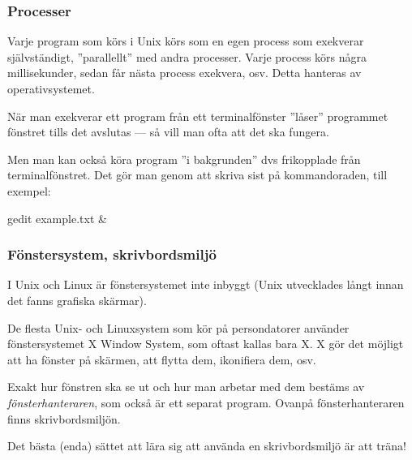 \begin{frame}[fragile=singleslide]
\frametitle{Processer}
Varje program som körs i Unix körs som en egen process som exekverar självständigt, ''parallellt'' med andra processer. Varje process körs några millisekunder, sedan får nästa process exekvera, osv. Detta hanteras av operativsystemet.

\pindent När man exekverar ett program från ett terminalfönster ''låser'' programmet fönstret tills det avslutas --- så vill man ofta att det ska fungera.

\pindent Men man kan också köra program ''i bakgrunden'' dvs frikopplade från terminalfönstret. Det gör man genom att skriva \code{\&} sist på kommandoraden, till exempel:

\begin{Code}
gedit example.txt &
\end{Code}

\end{frame} 

\begin{frame}[fragile=singleslide]
\frametitle{Fönstersystem, skrivbordsmiljö}
I Unix och Linux är fönstersystemet inte inbyggt (Unix utvecklades långt innan det fanns grafiska skärmar).

\pindent De flesta Unix- och Linuxsystem som kör på persondatorer använder fönstersystemet X Window System, som oftast kallas bara X. X gör det möjligt att ha fönster på skärmen, att flytta dem, ikonifiera dem, osv.

\pindent Exakt hur fönstren ska se ut och hur man arbetar med dem bestäms av \emph{fönsterhanteraren}, som också är ett separat program. Ovanpå fönsterhanteraren finns skrivbordsmiljön.

\pindent Det bästa (enda) sättet att lära sig att använda en skrivbordsmiljö är att träna!
\end{frame} 

